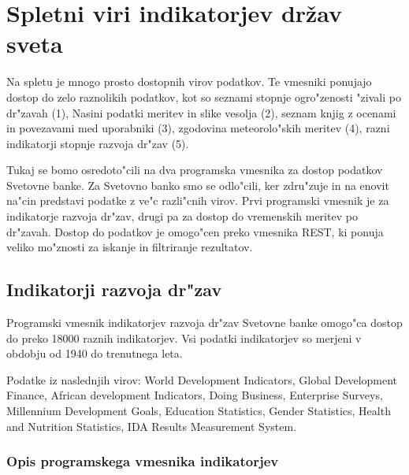 \chapter{Spletni viri indikatorjev držav sveta}

Na spletu je mnogo prosto dostopnih virov podatkov. Te vmesniki ponujajo dostop
do zelo raznolikih podatkov, kot so seznami stopnje ogro"zenosti "zivali po
dr"zavah (1), Nasini podatki meritev in slike vesolja (2), seznam knjig z 
ocenami in povezavami med uporabniki (3), zgodovina meteorolo"skih meritev (4),
razni indikatorji stopnje razvoja dr"zav (5).



% 
% 
% 
% 




Tukaj se bomo osredoto"cili
na dva programska vmesnika za dostop podatkov Svetovne banke. Za Svetovno banko
smo se odlo"cili, ker zdru"zuje in na enovit na"cin predstavi podatke z ve"c
razli"cnih virov. Prvi programski vmesnik je za indikatorje razvoja dr"zav,
drugi pa za dostop do vremenskih meritev po dr"zavah. Dostop do podatkov je
omogo"cen preko vmesnika REST, ki ponuja veliko mo"znosti za iskanje in
filtriranje rezultatov.


\section{Indikatorji razvoja dr"zav}

Programski vmesnik indikatorjev razvoja dr"zav Svetovne banke omogo"ca dostop
do preko 18000 raznih indikatorjev. Vsi podatki indikatorjev so merjeni v
obdobju od 1940 do trenutnega leta. 

Podatke iz naslednjih virov:
World Development Indicators, 
Global Development Finance, 
African development Indicators, 
Doing Business,
Enterprise Surveys, 
Millennium Development Goals, 
Education Statistics, 
Gender Statistics,
Health and Nutrition Statistics, 
IDA Results Measurement System.


\subsection{Opis programskega vmesnika indikatorjev}


